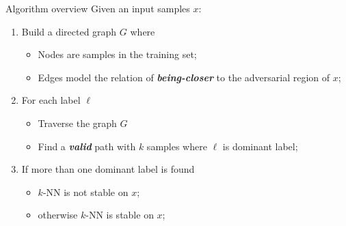 \begin{frame}{Algorithm overview}
    Given an input samples $x$:
    \begin{enumerate}
        \item<2-> Build a directed graph $G$ where
            \begin{itemize}
                \item Nodes are samples in the training set;
                \item Edges model the relation of \textbf{\emph{being-closer}} to the adversarial region of $x$;
            \end{itemize}
        \item<3-> For each label $\ell$
            \begin{itemize}
                \item Traverse the graph $G$
                \item Find a \textbf{\emph{valid}} path with $k$ samples where $\ell$ is dominant label;
            \end{itemize}
         \item<4-> If more than one dominant label is found
            \begin{itemize}
                \item $k$-NN is not stable on $x$;
                \item otherwise $k$-NN is stable on $x$;
            \end{itemize}
    \end{enumerate}
\end{frame}

